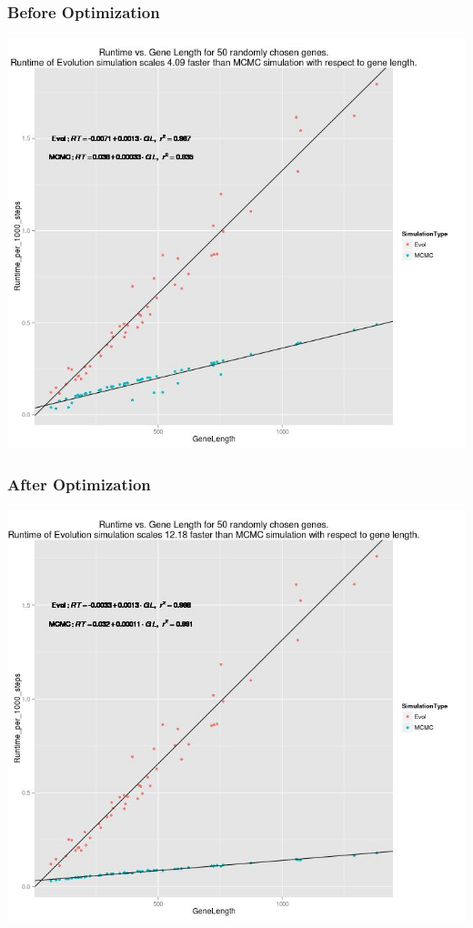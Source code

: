 \documentclass{article}
\begin{document}
 	\subsubsection{Before Optimization}
 	\includegraphics[scale=0.5]{../runtime/Runtime_plot_random_50.jpg}
 	
 	\subsubsection{After Optimization}
 	\includegraphics[scale=0.5]{../runtime/Runtime_plot_random_50_after_profile.jpg}
 \newpage
\end{document}
